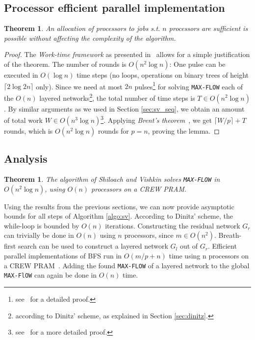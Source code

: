 \documentclass[a4paper,10pt, twocolumn]{article}
\newtheorem{theorem}[lemma]{Theorem}
\begin{document}
\subsection{Processor efficient parallel implementation}
\label{sec:sv_nr_procs}
\begin{theorem}
An allocation of processors to jobs s.t. $n$ processors are sufficient is possible without affecting the complexity of the algorithm. 
\end{theorem}
\begin{proof}
The \emph{Work-time framework} as presented in~\cite{vishkin92} allows for a simple justification of the theorem. The number of rounds is $O(n^2 \log n)$: One pulse can be executed in $O(\log n)$ time steps (no loops, operations on binary trees of height $\lceil 2 \log 2n \rceil$ only). Since we need at most $2n$ pulses\footnote{see~\cite{yossi81} for a detailed proof.} for solving \lstinline|MAX-FLOW| each of the $O(n)$ layered networks\footnote{according to Dinitz' scheme, as explained in Section \ref{sec:dinitz}.}, the total number of time steps is $T \in O(n^{2} \log n)$. By similar arguments as we used in Section \ref{sec:sv_seq}, we obtain an amount of total work $W \in O(n^{3} \log n)$\footnote{see~\cite{yossi81} for a more detailed proof.}. Applying \emph{Brent's theorem}~\cite{Brent74}, we get $\lceil W/p \rceil + T$ rounds, which is $O(n^{2} \log n)$ rounds for $p=n$, proving the lemma.
\end{proof}

\subsection{Analysis}
\label{sec:sv_analysis}
\begin{theorem}
The algorithm of Shiloach and Vishkin solves \lstinline|MAX-FLOW| in  $O(n^{2} \log n)$, using $O(n)$ processors on a CREW PRAM.
\end{theorem}

Using the results from the previous sections, we can now provide asymptotic bounds for all steps of Algorithm \ref{algo:sv}. According to Dinitz' scheme, the while-loop is bounded by $O(n)$ iterations. Constructing the residual network $G_r$ can trivially be done in $O(n)$ using $n$ processors, since $m \in O(n^{2})$. Breath-first search can be used to construct a layered network $G_l$ out of $G_r$. Efficient parallel implementations of BFS run in $O(m/p +n)$ time using n processors on a CREW PRAM~\cite{Varman87}. Adding the found \lstinline|MAX-FLOW| of a layered network to the global \lstinline|MAX-FlOW| can again be done in $O(n)$ time. 
\end{document}
